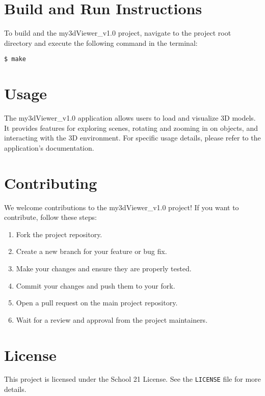 \documentclass{article}
\begin{document}
\section{Build and Run Instructions}
To build and the my3dViewer\_v1.0 project, navigate to the project root directory and execute the following command in the terminal:

\begin{verbatim}
$ make
\end{verbatim}

\section{Usage}
The my3dViewer\_v1.0 application allows users to load and visualize 3D models. It provides features for exploring scenes, rotating and zooming in on objects, and interacting with the 3D environment. For specific usage details, please refer to the application's documentation.

\section{Contributing}
We welcome contributions to the my3dViewer\_v1.0 project! If you want to contribute, follow these steps:

\begin{enumerate}
\item Fork the project repository.
\item Create a new branch for your feature or bug fix.
\item Make your changes and ensure they are properly tested.
\item Commit your changes and push them to your fork.
\item Open a pull request on the main project repository.
\item Wait for a review and approval from the project maintainers.
\end{enumerate}

\section{License}
This project is licensed under the School 21 License. See the \texttt{LICENSE} file for more details.
\end{document}
